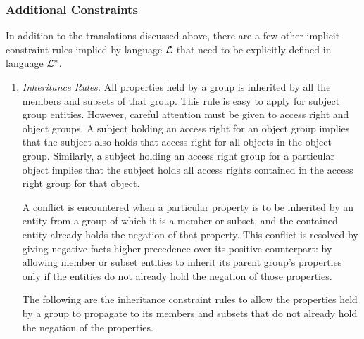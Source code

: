 \documentclass[11pt]{report}
\newenvironment{vquote}
{
  \begin{list}{}{\leftmargin 1em}\item[]
}
{
  \end{list}
}
\begin{document}
        \subsubsection{Additional Constraints}

          In addition to the translations discussed above, there are a few
          other implicit constraint rules implied by language ${\cal L}$
          that need to be explicitly defined in language ${\cal L}^{*}$.

          \begin{enumerate}
            \item
              {\em Inheritance Rules.}
              All properties held by a group is inherited by all the members
              and subsets of that group. This rule is easy to apply for
              subject group entities. However, careful attention must be
              given to access right and object groups. A subject holding an
              access right for an object group implies that the subject also
              holds that access right for all objects in the object group.
              Similarly, a subject holding an access right group for a
              particular object implies that the subject holds all access
              rights contained in the access right group for that object.

              A conflict is encountered when a particular property is to be
              inherited by an entity from a group of which it is a member or
              subset, and the contained entity already holds the negation of
              that property. This conflict is resolved by giving negative
              facts higher precedence over its positive counterpart: by
              allowing member or subset entities to inherit its parent
              group's properties only if the entities do not already hold
              the negation of those properties.

              The following are the inheritance constraint rules to allow the
              properties held by a group to propagate to its members and
              subsets that do not already hold the negation of the
              properties.

\end{enumerate}
\end{document}
